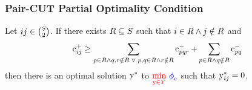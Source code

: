 \begin{frame}
    \frametitle{Pair-CUT Partial Optimality Condition}
    Let $ij \in \binom{S}{2}$.
    If there exists $R \subseteq S$
    such that $i \in R \land j \notin R$ and
    \[
        \operatorname{c}^+_{ij} \geq 
        \sum\limits_{p \in R \land q,r \notin R \;\lor\; p,q \in R \land r \notin R}
        \operatorname{c}^-_{pqr} +
        \sum\limits_{p \in R \land q \notin R}
        \operatorname{c}^-_{pq}
    \]
    then there is an optimal solution $\operatorname{y}^*$
    to $\text{\textcolor{red}{$\min\limits_{\operatorname{y} \in Y}$} \textcolor{blue}{$\operatorname{\phi}_{\operatorname{c}}$}}$
    such that $\operatorname{y}^*_{ij} = 0$.\\
    \vspace{10px}


\end{frame}
